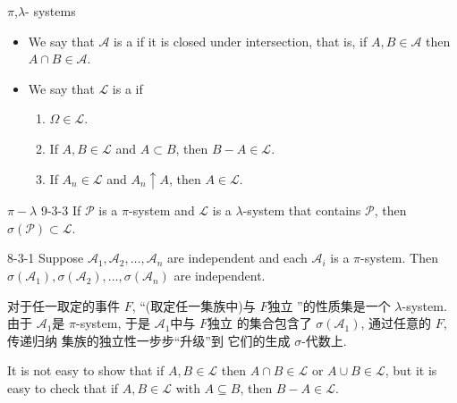 \documentclass[../main.tex]{subfiles}
\begin{document}
\begin{definition}{\(  \pi  \),\(   \lambda   \)- systems  }{}
    \begin{itemize}
        \item  We say that $\mathcal{A}$ is a  if it is closed under intersection, that is, if $A, B \in \mathcal{A}$ then $A \cap B \in \mathcal{A}$. 
        \item     
 We say that $\mathcal{L}$ is a  if
\begin{enumerate}
    \item[(i)] $\Omega \in \mathcal{L}$.
    \item[(ii)] If $A, B \in \mathcal{L}$ and $A \subset B$, then $B - A \in \mathcal{L}$.
    \item[(iii)] If $A_n \in \mathcal{L}$ and $A_n \uparrow A$, then $A \in \mathcal{L}$.
\end{enumerate}
    \end{itemize}

\end{definition}
\begin{theorem}{$\pi - \lambda$ }{9-3-3}
If $\mathcal{P}$ is a $\pi$-system and $\mathcal{L}$ is a $\lambda$-system that contains $\mathcal{P}$, then $\sigma(\mathcal{P}) \subset \mathcal{L}$.
\end{theorem}
\begin{theorem}{}{8-3-1}
Suppose $\mathcal{A}_1, \mathcal{A}_2, \dots, \mathcal{A}_n$ are independent and each $\mathcal{A}_i$ is a $\pi$-system. Then $\sigma(\mathcal{A}_1), \sigma(\mathcal{A}_2), \dots, \sigma(\mathcal{A}_n)$ are independent.
\end{theorem}
\begin{proofsketch}
     对于任一取定的事件 \(  F \),  ``(取定任一集族中)与 \(  F  \)独立 ''的性质集是一个 \(   \lambda   \)-system. 由于 \(  \mathcal{A}_{1}  \)是 \(   \pi  \)-system,  于是 \(  \mathcal{A}_{1}  \)中与 \(  F  \)独立 的集合包含了 \(   \sigma \left( \mathcal{A}_{1} \right)   \), 通过任意的 \(  F  \), 传递归纳 集族的独立性一步步``升级''到 它们的生成 \(   \sigma   \)-代数上.   
\end{proofsketch}
\begin{remark}
    It is not easy to show that if \(  A,B \in \mathcal{L}  \) then \(  A\cap B\in \mathcal{L}  \) or \(  A\cup B\in \mathcal{L}  \), but it is easy to check that if \(  A,B\in \mathcal{L}  \) with \(  A\subseteq B  \), then \(  B-A\in \mathcal{L}  \).      
\end{remark}
\end{document}
